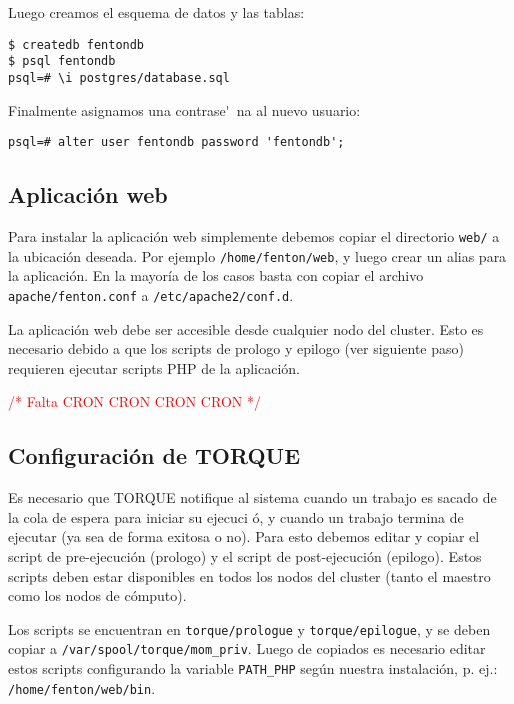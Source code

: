 \documentclass[a4paper,10pt,spanish]{article}
\begin{document}
Luego creamos el esquema de datos y las tablas:

\begin{verbatim}
$ createdb fentondb 
$ psql fentondb
psql=# \i postgres/database.sql
\end{verbatim}

Finalmente asignamos una contrase\'~{n}a al nuevo usuario:

\begin{verbatim}
psql=# alter user fentondb password 'fentondb';
\end{verbatim}

\subsection{Aplicaci\'{o}n web}

Para instalar la aplicaci\'{o}n web simplemente debemos copiar el directorio \mbox{\texttt{web/}} a la ubicaci\'{o}n deseada. Por ejemplo \mbox{\texttt{/home/fenton/web}}, y luego crear un alias para la aplicaci\'{o}n. En la mayor\'{i}a de los casos basta con copiar el archivo \mbox{\texttt{apache/fenton.conf}} a \mbox{\texttt{/etc/apache2/conf.d}}.

La aplicaci\'{o}n web debe ser accesible desde cualquier nodo del cluster. Esto es necesario debido a que los scripts de prologo y epilogo (ver siguiente paso) requieren ejecutar scripts PHP de la aplicaci\'{o}n.

\textcolor{red}{\Large /{*} Falta CRON CRON CRON CRON {*}/}

\subsection{Configuraci\'{o}n de TORQUE}

Es necesario que TORQUE notifique al sistema cuando un trabajo es sacado de la cola de espera para iniciar su ejecuci
\'{o}, y cuando un trabajo termina de ejecutar (ya sea de forma exitosa o no). Para esto debemos editar y copiar el script de pre-ejecuci\'{o}n (prologo) y el script de post-ejecuci\'{o}n (epilogo). Estos scripts deben estar disponibles en todos los nodos del cluster (tanto el maestro como los nodos de c\'{o}mputo). 

Los scripts se encuentran en \mbox{\texttt{torque/prologue}} y \mbox{\texttt{torque/epilogue}}, y se deben copiar a \mbox{\texttt{/var/spool/torque/mom\_priv}}. Luego de copiados es necesario editar estos scripts configurando la variable \mbox{\texttt{PATH\_PHP}} seg\'{u}n nuestra instalaci\'{o}n, p. ej.: \mbox{\texttt{/home/fenton/web/bin}}.
\end{document}
